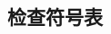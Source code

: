 \documentclass[class=book, crop=false]{standalone}
\begin{document}
\begin{CJK}{UTF8}{gbsn}

\chapter{检查符号表}



\cleardoublepage

\end{CJK}
\end{document}
